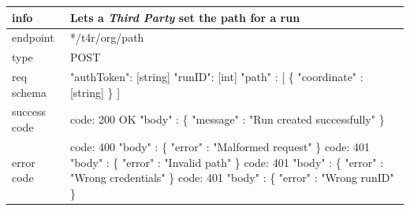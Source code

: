 \documentclass[titlepage]{article}
\begin{document}
\begin{tabularx}{\textwidth}{lX} \hline
    info & Lets a {\it Third Party} set the path for a run \\ \hline
    endpoint & */t4r/org/path \\ \hline
    type & POST \\ \hline
    req schema & 
        "authToken": [string] \newline
        "runID": [int] \newline
        "path" : [ \newline
        \{ \newline
        "coordinate" : [string] \newline
        \} \newline
        ]
        \\ \hline
    success code &
        code: 200 OK \newline  
        "body" : \{ \newline
        "message" : "Run created successfully" \newline
        \} \\ \hline
    error code &
        code: 400 \newline
        "body" : \{ "error" : "Malformed request" \} \newline \newline
        code: 401 \newline
        "body" : \{ "error" : "Invalid path" \} \newline \newline
        code: 401 \newline
        "body" : \{ "error" : "Wrong credentials" \} \newline \newline
        code: 401 \newline
        "body" : \{ "error" : "Wrong runID" \} \\\hline
\end{tabularx}
		
\vspace{\baselineskip}
\end{document}
